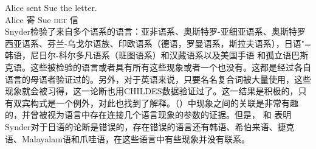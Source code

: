 \ex 
\gll Alice sent Sue the letter.\\ 
    Alice 寄 Sue \textsc{det} 信\\           
\zl 
Snyder检验了来自多个语系的语言：亚非语系、奥斯特罗-亚细亚语系、奥斯特罗西亚语系、芬兰-乌戈尔语族、印欧语系（德语，罗曼语系，斯拉夫语系），日语"=韩语，尼日尔-科尔多凡语系（班图语系）和汉藏语系以及美国手语 和孤立语巴斯克语。这些被检验的语言或者具有所有这些现象或者一个也没有。这都是经过各自语言的母语者验证过的。另外，对于英语来说，只要名名复合词被大量使用，这些现象就会被习得，这一论断也用CHILDES数据验证过了。这一结果是积极的，只有双宾构式是一个例外，对此也找到了解释。（）中现象之间的关联是非常有趣的，并曾被视为语言中存在连接几个语言现象的参数的证据。但是， \citet{Son2007a}和 \citet{SonS2008a}表明Synder对于日语的论断是错误的，存在错误的语言还有韩语、希伯来语、捷克语、Malayalam语和爪哇语，在这些语言中有些现象并没有联系。

